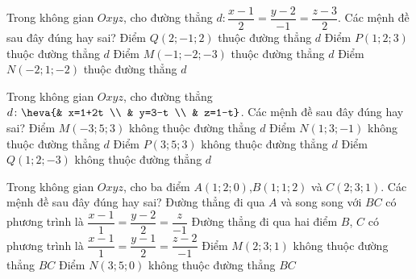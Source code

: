 \begin{ex}%
Trong không gian $Oxyz$, cho đường thẳng $d \colon \dfrac{x-1}{2}=\dfrac{y-2}{-1}=\dfrac{z-3}{2}$. Các mệnh đề sau đây đúng hay sai?
	\choiceTF
	{ Điểm $Q\left( 2;-1;2 \right)$ thuộc đường thẳng $d$}
	{ \True Điểm $P\left( 1;2;3 \right)$ thuộc đường thẳng $d$}
	{ Điểm $M\left( -1;-2;-3 \right)$ thuộc đường thẳng $d$}
	{ Điểm $N\left( -2;1;-2 \right)$ thuộc đường thẳng $d$}
\end{ex}
\begin{ex}%
Trong không gian $Oxyz$, cho đường thẳng $d\colon \heva{& x=1+2t \\ 
		& y=3-t \\ 
		& z=1-t}$. Các mệnh đề sau đây đúng hay sai?
	\choiceTF
	{ Điểm $M\left( -3;5;3 \right)$ không thuộc đường thẳng $d$}
	{ \True Điểm $N\left( 1;3;-1 \right)$ không thuộc đường thẳng $d$}
	{ \True Điểm $P\left( 3;5;3 \right)$ không thuộc đường thẳng $d$}
	{ \True Điểm $Q\left( 1;2;-3 \right)$ không thuộc đường thẳng $d$}
\end{ex}
\begin{ex}%
Trong không gian $Oxyz$, cho ba điểm $A(1;2;0)$,$B(1;1;2)$ và $C(2;3;1)$. Các mệnh đề sau đây đúng hay sai?
	\choiceTF
	{ \True Đường thẳng đi qua $A$ và song song với $BC$ có phương trình là $\dfrac{x-1}{1}=\dfrac{y-2}{2}=\dfrac{z}{-1}$}
	{\True Đường thẳng đi qua hai điểm $B$, $C$ có phương trình là $\dfrac{x-1}{1}=\dfrac{y-1}{2}=\dfrac{z-2}{-1}$}
	{ Điểm $M\left( 2;3;1 \right)$ không thuộc đường thẳng $BC$}
	{\True  Điểm $N\left( 3;5;0 \right)$ không thuộc đường thẳng $BC$}
\end{ex}
